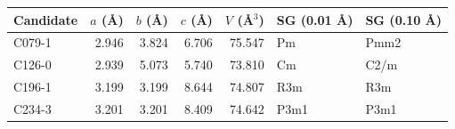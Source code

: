 \begin{tabular}{lrrrrll}
\toprule
Candidate & $a$ (\AA) & $b$ (\AA) & $c$ (\AA) & $V$ (\AA$^3$) & SG (0.01 \AA) & SG (0.10 \AA) \\
\midrule
C079-1 & 2.946 & 3.824 & 6.706 & 75.547 & Pm & Pmm2 \\
C126-0 & 2.939 & 5.073 & 5.740 & 73.810 & Cm & C2/m \\
C196-1 & 3.199 & 3.199 & 8.644 & 74.807 & R3m & R3m \\
C234-3 & 3.201 & 3.201 & 8.409 & 74.642 & P3m1 & P3m1 \\
\bottomrule
\end{tabular}
